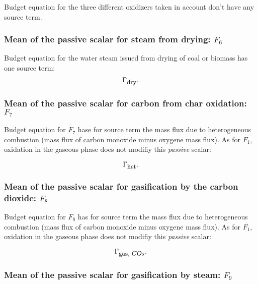 Budget equation for the three different oxidizers taken in account don't have
any source term.
\subsubsection{Mean of the passive scalar for steam from drying: $F_{6}$}

Budget equation for the water steam issued from drying of coal or biomass has
one source term:
\begin{equation}
    \Gamma_{\mbox{\small dry}}.
\end{equation}


\subsubsection{Mean of the passive scalar for carbon from char oxidation: $F_{7}$}

Budget equation for $F_{7}$ hase for source term the mass flux due to
heterogeneous combustion (mass flux of carbon monoxide minus oxygene mass
flux). As for $F_{1}$, oxidation in the gaseous phase does not modifiy this {\em
  passive} scalar:

\begin{equation}
   \Gamma_{\mbox{\small het}}.
\end{equation}

\subsubsection{Mean of the passive scalar for gasification by the carbon dioxide: $F_{8}$}

 Budget equation for $F_{8}$ has for source term the mass flux due to
 heterogeneous combustion (mass flux of carbon monoxide minus oxygene mass
 flux). As for $F_{1}$, oxidation in the gaseous phase does not modifiy this
 {\em passive} scalar:

\begin{equation}
   \Gamma_{\mbox{\small gas, $CO_2$}}.
\end{equation}

\subsubsection{Mean of the passive scalar for gasification by steam: $F_{9}$}

